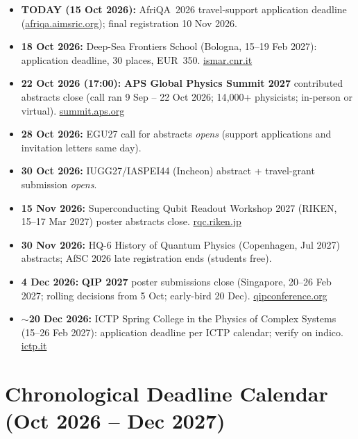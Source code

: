 \documentclass[11pt,a4paper]{article}
\begin{document}
\begin{itemize}[leftmargin=1.4em]
  \item \textbf{TODAY (15 Oct 2026):} AfriQA~2026 travel-support application deadline (\href{https://afriqa.aimsric.org/}{afriqa.aimsric.org}); final registration 10 Nov 2026.
  \item \textbf{18 Oct 2026:} Deep-Sea Frontiers School (Bologna, 15--19 Feb 2027): application deadline, 30 places, EUR~350. \href{https://www.ismar.cnr.it/en/deep-sea-frontiers-school/}{ismar.cnr.it}
  \item \textbf{22 Oct 2026 (17:00):} \textbf{APS Global Physics Summit 2027} contributed abstracts close (call ran 9 Sep -- 22 Oct 2026; 14{,}000+ physicists; in-person or virtual). \href{https://summit.aps.org/attend/abstracts/}{summit.aps.org}
  \item \textbf{28 Oct 2026:} EGU27 call for abstracts \emph{opens} (support applications and invitation letters same day).
  \item \textbf{30 Oct 2026:} IUGG27/IASPEI44 (Incheon) abstract + travel-grant submission \emph{opens}.
  \item \textbf{15 Nov 2026:} Superconducting Qubit Readout Workshop 2027 (RIKEN, 15--17 Mar 2027) poster abstracts close. \href{https://rqc.riken.jp/sqrw2027/}{rqc.riken.jp}
  \item \textbf{30 Nov 2026:} HQ-6 History of Quantum Physics (Copenhagen, Jul 2027) abstracts; AfSC 2026 late registration ends (students free).
  \item \textbf{4 Dec 2026:} \textbf{QIP 2027} poster submissions close (Singapore, 20--26 Feb 2027; rolling decisions from 5 Oct; early-bird 20 Dec). \href{https://qipconference.org/2027/call/}{qipconference.org}
  \item \textbf{$\sim$20 Dec 2026:} ICTP Spring College in the Physics of Complex Systems (15--26 Feb 2027): application deadline per ICTP calendar; verify on indico. \href{https://www.ictp.it/home/scientific-calendar}{ictp.it}
\end{itemize}

\section{Chronological Deadline Calendar (Oct 2026 -- Dec 2027)}
\end{document}
